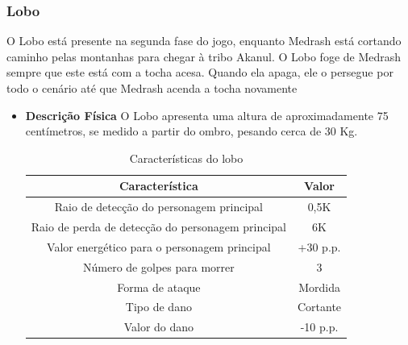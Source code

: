 \subsubsection{Lobo}
O Lobo está presente na segunda fase do jogo, enquanto Medrash está cortando caminho pelas montanhas para chegar à tribo Akanul. O Lobo foge de Medrash sempre que este está com a tocha acesa. Quando ela apaga, ele o persegue por todo o cenário até que Medrash acenda a tocha novamente
\begin{itemize}
\item {\bf Descrição Física}
O Lobo apresenta uma altura de aproximadamente 75 centímetros, se medido a partir do ombro, pesando cerca de 30 Kg.
\begin{table}[H]
\begin{center}
\begin{tabular}{|c|c|}
\hline 
\textbf{Característica} & \textbf{Valor} \\ 
\hline 
Raio de detecção do personagem principal & 0,5K \\ 
\hline 
Raio de perda de detecção do personagem principal & 6K \\ 
\hline 
Valor energético para o personagem principal & +30 p.p. \\ 
\hline 
Número de golpes para morrer & 3 \\ 
\hline 
Forma de ataque & Mordida \\ 
\hline 
Tipo de dano & Cortante \\ 
\hline 
Valor do dano & -10 p.p. \\ 
\hline 
\end{tabular} 
\end{center}
\caption{Características do lobo}
\label{table:lobo}
\end{table}
\end{itemize}
